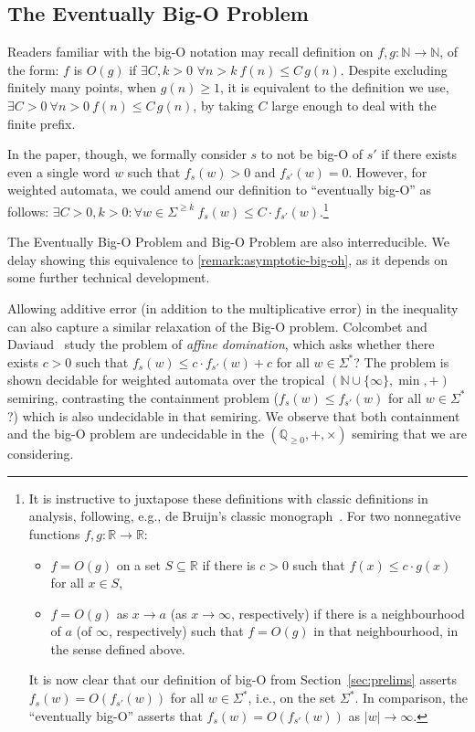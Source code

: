 \documentclass[10pt,a4paper]{amsart}
\numberwithin{equation}{section}
\theoremstyle{plain}
\theoremstyle{definition}
\theoremstyle{remark}
\renewcommand\nu{f}
\begin{document}
\subsection{The Eventually Big-O Problem}
\label{remark:asymptotic-big-oh:first}
Readers familiar with the big-O notation may recall definition on $f,g:\mathbb{N} \to \mathbb{N}$, of the form:
$f$ is $O(g)$ if $\exists C,k>0 $ $\forall n > k \  f(n) \le C\, g(n)$.
Despite excluding finitely many points, when $g(n)\ge 1$, it is equivalent to the definition we use,
$\exists {C > 0}\  \forall {n > 0} \  f(n) \le C\, g(n)$, by taking  $C$ large enough to deal with the finite prefix.

In the paper, though, we formally consider $s$ to not be big-O of $s'$ if there exists even a single word $w$ such that $\nu_s(w) > 0$ and $\nu_{s'}(w) = 0$.
However, for weighted automata, we could amend our definition to ``eventually big-O'' as follows: $\exists C> 0, k> 0 :  \forall w \in \Sigma^{\ge k} \ \nu_s(w) \le C \cdot \nu_{s'}(w)$.\footnote{It is instructive to juxtapose these definitions with classic definitions
in analysis,
following, e.g., de Bruijn's classic monograph~\cite[Section~1.2]{deBruijn}.
For two nonnegative functions $f, g \colon \mathbb{R} \to \mathbb{R}$:
\begin{itemize}[---]
\item
$f=O(g)$ on a set $S \subseteq \mathbb{R}$ if there is $c>0$ such that
$f(x) \le c \cdot g(x)$ for all $x \in S$,
\item
$f=O(g)$ as $x \to a$ (as $x \to \infty$, respectively)
if there is a neighbourhood of $a$ (of $\infty$, respectively)
such that $f=O(g)$ in that neighbourhood, in the sense defined above.
\end{itemize}
It is now clear that our definition of big-O from Section~\ref{sec:prelims}
asserts $\nu_s(w) = O(\nu_{s'}(w))$ for all $w\in \Sigma^*$,
i.e., on the set $\Sigma^*$.
In comparison, the ``eventually big-O'' asserts that
$\nu_s(w) = O(\nu_{s'}(w))$ as $|w| \to \infty$.
}

The Eventually Big-O Problem and Big-O Problem are also interreducible. We delay showing this equivalence to \cref{remark:asymptotic-big-oh}, as it depends on some further technical development.

Allowing additive error (in addition to the multiplicative error) in the inequality can also capture a similar relaxation of the Big-O problem.
Colcombet and Daviaud~\cite{ColcombetD13} study the problem of \emph{affine domination}, which asks whether there exists $c>0$ such that  $f_{s}(w) \le c\cdot f_{s'}(w) + c$ for all $w\in\Sigma^*$? 
The problem is shown decidable for weighted automata over the tropical  $(\mathbb{N}\cup\{\infty\},\min,+)$ semiring, contrasting the containment problem ($f_{s}(w) \le  f_{s'}(w)$ for all $w\in\Sigma^*$?) which is also undecidable in that semiring. 
We observe that both containment and the big-O problem are undecidable in the $(\mathbb{Q}_{\ge0},+,\times)$ semiring that we are considering.
\end{document}
